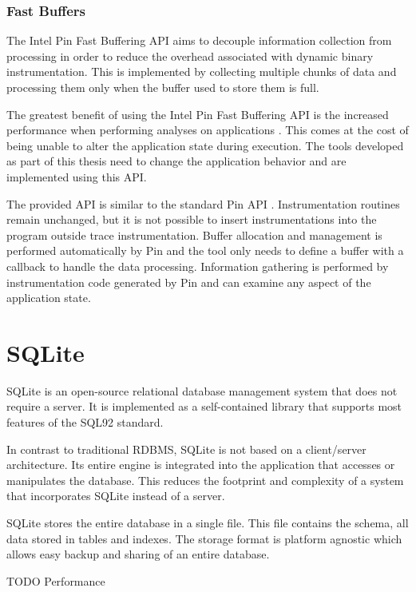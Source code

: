 \subsubsection{Fast Buffers}

The Intel Pin Fast Buffering API \cite{pinbuffer} aims to decouple information collection from processing in order to reduce the overhead associated with dynamic binary instrumentation. This is implemented by collecting multiple chunks of data and processing them only when the buffer used to store them is full.

The greatest benefit of using the Intel Pin Fast Buffering API is the increased performance when performing analyses on applications \cite{pinbuffer}. This comes at the cost of being unable to alter the application state during execution. The tools developed as part of this thesis need to change the application behavior and are implemented using this API.

The provided API is similar to the standard Pin API \cite{pindoc}. Instrumentation routines remain unchanged, but it is not possible to insert instrumentations into the program outside trace instrumentation. Buffer allocation and management is performed automatically by Pin and the tool only needs to define a buffer with a callback to handle the data processing. Information gathering is performed by instrumentation code generated by Pin and can examine any aspect of the application state.

\section{SQLite}

SQLite \cite{sqlitebook} is an open-source relational database management system that does not require a server. It is implemented as a self-contained library that supports most features of the SQL92 standard.

In contrast to traditional RDBMS, SQLite is not based on a client/server architecture. Its entire engine is integrated into the application that accesses or manipulates the database. This reduces the footprint and complexity of a system that incorporates SQLite instead of a server.

SQLite stores the entire database in a single file. This file contains the schema, all data stored in tables and indexes. The storage format is platform agnostic which allows easy backup and sharing of an entire database.

TODO Performance


